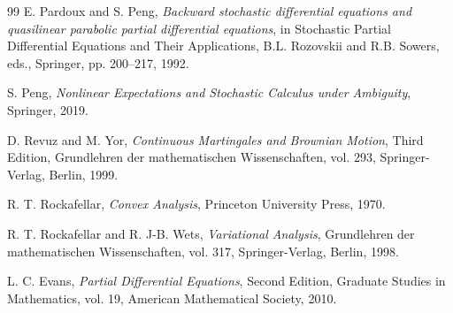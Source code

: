 \documentclass[12pt, letterpaper]{amsart}
\theoremstyle{plain}
\theoremstyle{definition}
\theoremstyle{remark}
\numberwithin{equation}{section} %
\begin{document}
\begin{thebibliography}{99}
E. Pardoux and S. Peng,
\textit{Backward stochastic differential equations and quasilinear parabolic partial differential equations},
in Stochastic Partial Differential Equations and Their Applications, B.L. Rozovskii and R.B. Sowers, eds., Springer, pp. 200--217, 1992.

S. Peng,
\textit{Nonlinear Expectations and Stochastic Calculus under Ambiguity},
Springer, 2019.

D. Revuz and M. Yor,
\textit{Continuous Martingales and Brownian Motion}, Third Edition,
Grundlehren der mathematischen Wissenschaften, vol. 293, Springer-Verlag, Berlin, 1999.

R. T. Rockafellar,
\textit{Convex Analysis},
Princeton University Press, 1970.

R. T. Rockafellar and R. J-B. Wets,
\textit{Variational Analysis},
Grundlehren der mathematischen Wissenschaften, vol. 317, Springer-Verlag, Berlin, 1998.

L. C. Evans,
\textit{Partial Differential Equations}, Second Edition,
Graduate Studies in Mathematics, vol. 19, American Mathematical Society, 2010.

\end{thebibliography}
\end{document}
